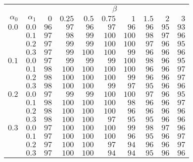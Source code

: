 \begin{tabular}{rr|rrrrrrrr}
\hline\hline
 && \multicolumn{8}{c}{$\beta$}\\
 $\alpha_0$ & $\alpha_1$ & $0$ & $0.25$ & $0.5$ & $0.75$ & $1$ & $1.5$ & $2$ & $3$ \\ 
 \hline
$0.0$ & $0.0$ & $96$ & $97$ & $96$ & $97$ & $96$ & $96$ & $95$ & $93$\\ 
 & $0.1$ & $97$ & $98$ & $99$ & $100$ & $100$ & $98$ & $97$ & $96$\\ 
 & $0.2$ & $97$ & $99$ & $99$ & $100$ & $100$ & $97$ & $96$ & $95$\\ 
 & $0.3$ & $97$ & $99$ & $100$ & $100$ & $99$ & $96$ & $96$ & $96$\\ 
\hline 
 $0.1$ & $0.0$ & $97$ & $99$ & $99$ & $99$ & $100$ & $98$ & $96$ & $95$\\ 
 & $0.1$ & $98$ & $100$ & $100$ & $100$ & $100$ & $96$ & $96$ & $97$\\ 
 & $0.2$ & $98$ & $100$ & $100$ & $100$ & $99$ & $96$ & $96$ & $97$\\ 
 & $0.3$ & $98$ & $100$ & $100$ & $99$ & $97$ & $95$ & $96$ & $96$\\ 
\hline 
 $0.2$ & $0.0$ & $97$ & $99$ & $99$ & $100$ & $100$ & $97$ & $96$ & $95$\\ 
 & $0.1$ & $98$ & $100$ & $100$ & $100$ & $98$ & $96$ & $96$ & $97$\\ 
 & $0.2$ & $98$ & $100$ & $100$ & $100$ & $96$ & $96$ & $96$ & $96$\\ 
 & $0.3$ & $98$ & $100$ & $100$ & $97$ & $95$ & $95$ & $96$ & $96$\\ 
\hline 
 $0.3$ & $0.0$ & $97$ & $100$ & $100$ & $100$ & $99$ & $98$ & $97$ & $96$\\ 
 & $0.1$ & $97$ & $100$ & $100$ & $100$ & $96$ & $95$ & $96$ & $97$\\ 
 & $0.2$ & $97$ & $100$ & $100$ & $97$ & $94$ & $96$ & $96$ & $97$\\ 
 & $0.3$ & $97$ & $100$ & $100$ & $94$ & $94$ & $95$ & $96$ & $96$\\ 
 \hline 
 \end{tabular}